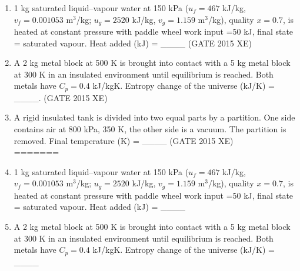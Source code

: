 \documentclass[journal,12pt,onecolumn]{IEEEtran}
\begin{document}
\begin{enumerate}
\begin{enumerate}
\begin{enumerate}
\begin{multicols}{2}
<<<<<<< HEAD
\end{multicols}


\item 1 kg saturated liquid–vapour water at 150 kPa ($u_f=467$ kJ/kg, $v_f=0.001053$ m$^3$/kg; $u_g=2520$ kJ/kg, $v_g=1.159$ m$^3$/kg), quality $x=0.7$, is heated at constant pressure with paddle wheel work input =50 kJ, final state = saturated vapour. Heat added (kJ) = \_\_\_\_
\hfill{(GATE 2015 XE)} \\


\item A 2 kg metal block at 500 K is brought into contact with a 5 kg metal block at 300 K in an insulated environment until equilibrium is reached. Both metals have $C_p=0.4$ kJ/kgK. Entropy change of the universe (kJ/K) = \_\_\_\_.
\hfill{(GATE 2015 XE)} \\

\item A rigid insulated tank is divided into two equal parts by a partition. One side contains air at 800 kPa, 350 K, the other side is a vacuum. The partition is removed. Final temperature (K) = \_\_\_\_
\hfill{(GATE 2015 XE)} \\
=======
\vspace{0.5cm}

\item 1 kg saturated liquid–vapour water at 150 kPa ($u_f=467$ kJ/kg, $v_f=0.001053$ m$^3$/kg; $u_g=2520$ kJ/kg, $v_g=1.159$ m$^3$/kg), quality $x=0.7$, is heated at constant pressure with paddle wheel work input =50 kJ, final state = saturated vapour. Heat added (kJ) = \_\_\_\_
\hfill{} \\

\vspace{0.5cm}

\item A 2 kg metal block at 500 K is brought into contact with a 5 kg metal block at 300 K in an insulated environment until equilibrium is reached. Both metals have $C_p=0.4$ kJ/kgK. Entropy change of the universe (kJ/K) = \_\_\_\_
\hfill{} \\


\end{enumerate}
\end{enumerate}
\end{enumerate}
\end{document}
